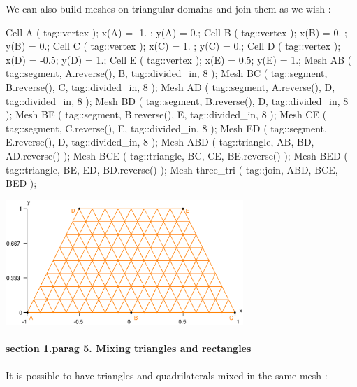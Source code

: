 We can also build meshes on triangular domains and {\codett join} them as we wish :

\verbatim
   Cell A ( tag::vertex );  x(A) = -1. ;  y(A) = 0.;
   Cell B ( tag::vertex );  x(B) =  0. ;  y(B) = 0.;
   Cell C ( tag::vertex );  x(C) =  1. ;  y(C) = 0.;
   Cell D ( tag::vertex );  x(D) = -0.5;  y(D) = 1.;
   Cell E ( tag::vertex );  x(E) =  0.5;  y(E) = 1.;
   Mesh AB ( tag::segment, A.reverse(), B, tag::divided_in, 8 );
   Mesh BC ( tag::segment, B.reverse(), C, tag::divided_in, 8 );
   Mesh AD ( tag::segment, A.reverse(), D, tag::divided_in, 8 );
   Mesh BD ( tag::segment, B.reverse(), D, tag::divided_in, 8 );
   Mesh BE ( tag::segment, B.reverse(), E, tag::divided_in, 8 );
   Mesh CE ( tag::segment, C.reverse(), E, tag::divided_in, 8 );
   Mesh ED ( tag::segment, E.reverse(), D, tag::divided_in, 8 );
   Mesh ABD ( tag::triangle, AB, BD, AD.reverse() );
   Mesh BCE ( tag::triangle, BC, CE, BE.reverse() );
   Mesh BED ( tag::triangle, BE, ED, BD.reverse() );
   Mesh three_tri ( tag::join, ABD, BCE, BED );
\endverbatim

{ 
\centerline{\includegraphics[width=9cm]{three-tri.eps}} }


\paragraph{\numb section 1.\numb parag 5. Mixing triangles and rectangles}

It is possible to have triangles and quadrilaterals mixed in the same mesh :

